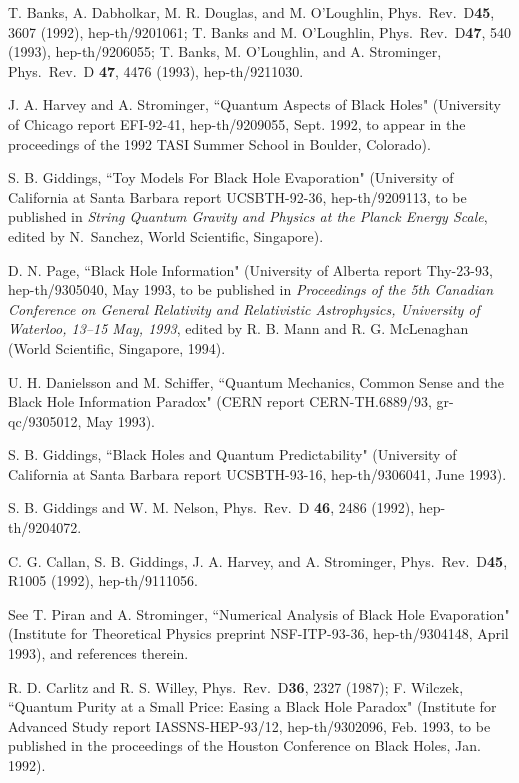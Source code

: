 \documentclass[12pt]{article}
\begin{document}
\begin{thebibliography}{99}
 T. Banks, A. Dabholkar, M. R. Douglas, and M.
O'Loughlin,
Phys.\ Rev.\ D{\bf45}, 3607 (1992), hep-th/9201061;
T. Banks and M. O'Loughlin,  Phys.\ Rev.\ D{\bf 47}, 540 (1993),
hep-th/9206055; T. Banks, M. O'Loughlin, and A. Strominger, Phys.\
Rev.\ D
{\bf 47}, 4476 (1993), hep-th/9211030.

 J. A. Harvey and A. Strominger, ``Quantum Aspects of
Black Holes"
(University of Chicago report EFI-92-41, hep-th/9209055, Sept. 1992,
to appear
in the proceedings of the 1992 TASI Summer School in Boulder,
Colorado).

 S. B. Giddings, ``Toy Models For Black Hole
Evaporation"
(University of California at Santa Barbara report UCSBTH-92-36,
hep-th/9209113,
to be published in {\em String Quantum Gravity and Physics at the
Planck Energy
Scale}, edited by N.~Sanchez, World Scientific, Singapore).

 D. N. Page, ``Black Hole Information" (University of
Alberta report Thy-23-93, hep-th/9305040, May 1993, to be published
in
{\em Proceedings of the 5th Canadian Conference
on General Relativity and Relativistic Astrophysics,
University of Waterloo, 13--15 May, 1993}, edited by R. B. Mann and
R. G. McLenaghan (World Scientific, Singapore, 1994).

 U. H. Danielsson and M. Schiffer, ``Quantum
Mechanics,
Common Sense and the Black Hole Information Paradox"
(CERN report CERN-TH.6889/93, gr-qc/9305012, May 1993).

 S. B. Giddings, ``Black Holes and Quantum
Predictability"
(University of California at Santa Barbara report UCSBTH-93-16,
hep-th/9306041, June 1993).

 S. B. Giddings and W. M. Nelson, Phys.\ Rev.\ D{\bf
46}, 2486
(1992), hep-th/9204072.

 C. G. Callan, S. B. Giddings, J. A. Harvey, and A.
Strominger,
Phys.\ Rev.\ D{\bf 45}, R1005 (1992), hep-th/9111056.

 See T. Piran and A. Strominger, ``Numerical Analysis
of Black
Hole
Evaporation" (Institute for Theoretical Physics preprint
NSF-ITP-93-36,
hep-th/9304148, April 1993), and references therein.

 R. D. Carlitz and R. S. Willey, Phys.\ Rev.\ D{\bf 36},
2327
(1987); F. Wilczek, ``Quantum Purity at a Small Price: Easing a Black
Hole Paradox" (Institute for Advanced Study report IASSNS-HEP-93/12,
hep-th/9302096, Feb. 1993, to be published in the proceedings of the
Houston
Conference on Black Holes, Jan. 1992).


\end{thebibliography}
\end{document}
